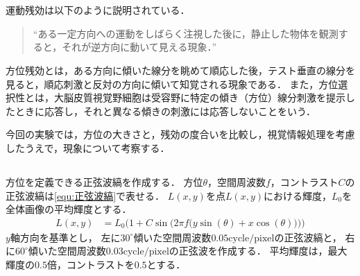 \chapter{\kadaic}
\section{\purpose}
運動残効は以下のように説明されている．
\begin{quote}
    ``ある一定方向への運動をしばらく注視した後に，静止した物体を観測すると，それが逆方向に動いて見える現象．''\\
    \hfill\cite[p.58]{認知心理学辞典}
\end{quote}
方位残効とは，ある方向に傾いた線分を眺めて順応した後，テスト垂直の線分を見ると，順応刺激と反対の方向に傾いて知覚される現象である\cite[p.5]{方位残効と運動残効のメカニズム}．
また，方位選択性とは，大脳皮質視覚野細胞は受容野に特定の傾き（方位）線分刺激を提示したときに応答し，それと異なる傾きの刺激には応答しないことをいう\cite[p.764]{認知心理学辞典}．\par
今回の実験では，方位の大きさと，残効の度合いを比較し，視覚情報処理を考慮したうえで，現象について考察する．
\section{\method}
\paragraph{\kadaica}
方位を定義できる正弦波縞を作成する．
方位\(\theta\)，空間周波数\(f\)，コントラスト\(C\)の正弦波縞は\eqref{equ:正弦波縞}で表せる．
\(L(x,y)\)を点\(L(x,y)\)における輝度，\(L_0\)を全体画像の平均輝度とする．
\begin{align}
    L(x,y) & = L_0\Bigg(1+C\sin\Big(2\pi f\big(y\sin(\theta)+x\cos(\theta)\big)\Big)\Bigg)\label{equ:正弦波縞}
\end{align}
\(y\)軸方向を基準とし，
左に\(30^\circ\)傾いた空間周波数\(0.05\textrm{cycle}/\textrm{pixel}\)の正弦波縞と，
右に\(60^{\circ}\)傾いた空間周波数\(0.03\textrm{cycle}/\textrm{pixel}\)の正弦波を作成する．
平均輝度は，最大輝度の\(0.5\)倍，コントラストを\(0.5\)とする．
